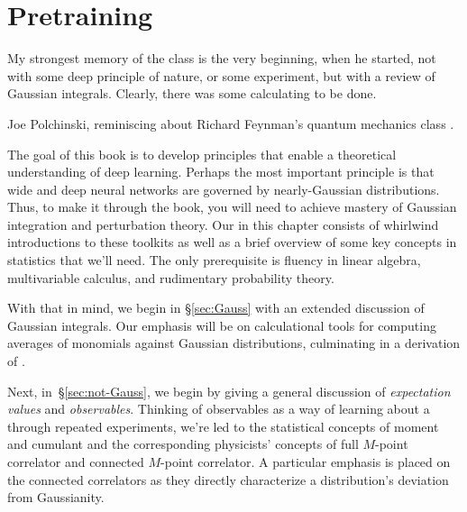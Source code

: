 
\chapter{Pretraining}
\label{ch:tools}

\epigraph{My strongest memory of the class is the very beginning, when he started, not with some deep principle of nature, or some experiment, but with a review of Gaussian integrals. Clearly, there was some calculating to be done.}{Joe Polchinski, reminiscing about Richard Feynman's quantum mechanics class \cite{Polchinski:2017vik}.}


\noindent{}The goal of this book is to develop principles that enable a theoretical understanding of deep learning.
Perhaps the most important principle is that wide and deep neural networks are governed by nearly-Gaussian distributions.
Thus, to make it through the book, you will need to achieve mastery of Gaussian integration and perturbation theory.
Our  in this chapter consists of whirlwind introductions to these  toolkits as well as a brief overview of some key concepts in statistics that we'll need.
The only prerequisite is fluency in linear algebra, multivariable calculus, and rudimentary probability theory.

With that in mind, we begin in \S\ref{sec:Gauss} with an extended discussion of
Gaussian integrals. Our emphasis will be on calculational tools for computing averages of monomials against Gaussian distributions, culminating in a derivation of .

Next, in~\S\ref{sec:not-Gauss}, we begin by giving a general discussion of \emph{expectation values} and \emph{observables}. 
Thinking of observables as a way of learning about a  through repeated experiments, we're led to the statistical concepts of moment and cumulant and the corresponding physicists' concepts of 
full $M$-point correlator and connected $M$-point correlator. 
A particular emphasis is placed on the connected correlators as they directly characterize a distribution's deviation from Gaussianity.

